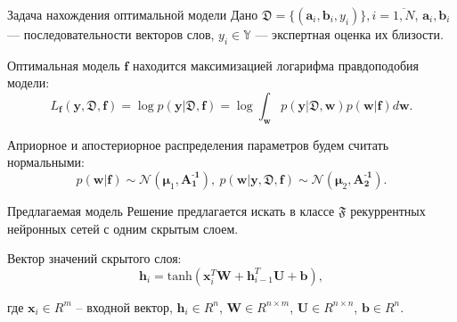 \documentclass{beamer}
\newcommand{\PP}{p}
\newcommand{\DD}{{\mathfrak{D}}}
\newcommand{\FFF}{{\mathfrak{F}}}
\newcommand{\bw}{{\textbf{w}}}
\newcommand{\ba}{{\textbf{a}}}
\newcommand{\bb}{{\textbf{b}}}
\newcommand{\bbf}{{\textbf{f}}}
\newcommand{\by}{{\textbf{y}}}
\newcommand{\bAo}{\mathbf{A^\text{-1}_\text{1}}}
\newcommand{\bAt}{\mathbf{A^\text{-1}_\text{2}}}
\newcommand{\bmuo}{{\boldsymbol{\mu}_1}}
\newcommand{\bmut}{{\boldsymbol{\mu}_2}}
\begin{document}
\begin{frame}{Задача нахождения оптимальной модели}
Дано $\DD = \{(\ba_i,\bb_i,y_i)\}, i = \overline{1,N}$,
$\ba_i, \bb_i$ --- последовательности векторов слов,
$y_i \in \mathbb{Y}$
--- экспертная оценка их близости. 

Оптимальная модель $\bbf$ находится максимизацией логарифма правдоподобия модели:%
$$L_\bbf(\by,\DD,\bbf) = \log \PP(\by|\DD,\bbf) = \log \int_{\bw}\PP(\by|\DD,\bw)\PP(\bw|\bbf)d\bw.$$

Априорное и апостериорное распределения параметров будем считать нормальными:
$$\PP(\bw|\bbf) \sim \mathcal{N}(\bmuo,\bAo), \ \PP(\bw|\by,\DD,\bbf) \sim \mathcal{N}(\bmut,\bAt).$$

\end{frame}

\begin{frame}{Предлагаемая модель}
Решение предлагается искать в классе $\mathfrak{F}$ рекуррентных нейронных сетей с одним скрытым слоем.


Вектор значений скрытого слоя:
$$\mathbf{h}_i = \text{tanh}(\mathbf{x}_i^T\mathbf{W} + \mathbf{h}_{i-1}^T\mathbf{U} + \mathbf{b}),$$

где $\mathbf{x}_i\in R^m$ -- входной вектор, $\mathbf{h}_i\in R^n$, $\mathbf{W}\in R^{n \times m}$, $\mathbf{U}\in R^{n \times n}$, $\mathbf{b} \in R^n$.
\end{frame}
\end{document}
